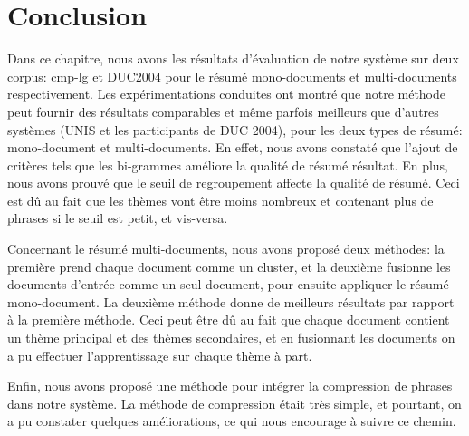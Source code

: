 \documentclass[a4paper,12pt,oneside]{../use/ESIthesis}
\begin{document}
\section{Conclusion}

Dans ce chapitre, nous avons les résultats d'évaluation de notre système sur deux corpus: cmp-lg et DUC2004 pour le résumé mono-documents et multi-documents respectivement. 
Les expérimentations conduites ont montré que notre méthode peut fournir des résultats comparables et même parfois meilleurs que d'autres systèmes (UNIS et les participants de DUC 2004), pour les deux types de résumé: mono-document et multi-documents. 
En effet, nous avons constaté que l'ajout de critères tels que les bi-grammes améliore la qualité de résumé résultat.
En plus, nous avons prouvé que le seuil de regroupement affecte la qualité de résumé. 
Ceci est dû au fait que les thèmes vont être moins nombreux et contenant plus de phrases si le seuil est petit, et vis-versa.

Concernant le résumé multi-documents, nous avons proposé deux méthodes: la première prend chaque document comme un cluster, et la deuxième fusionne les documents d'entrée comme un seul document, pour ensuite appliquer le résumé mono-document. 
La deuxième méthode donne de meilleurs résultats par rapport à la première méthode.
Ceci peut être dû au fait que chaque document contient un thème principal et des thèmes secondaires, et en fusionnant les documents on a pu effectuer l'apprentissage sur chaque thème à part. 

Enfin, nous avons proposé une méthode pour intégrer la compression de phrases dans notre système. 
La méthode de compression était très simple, et pourtant, on a pu constater quelques améliorations, ce qui nous encourage à suivre ce chemin.


\ifx\wholebook\relax\else
 \cleardoublepage
  
 
 
\end{document}

